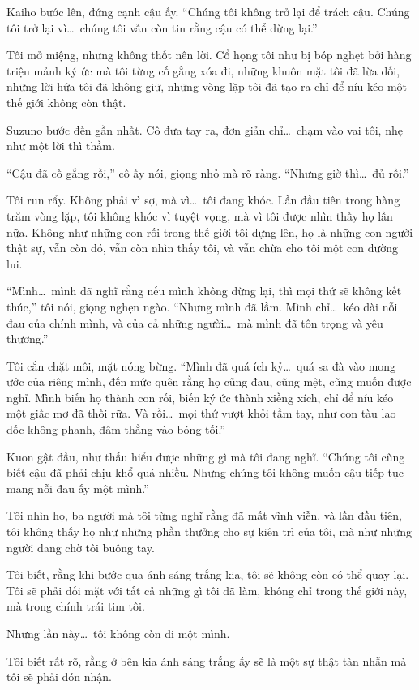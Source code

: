 \documentclass[../main.tex]{subfiles}
\begin{document}
Kaiho bước lên, đứng cạnh cậu ấy. ``Chúng tôi không trở lại để trách cậu. Chúng tôi trở lại vì\dots\ chúng tôi vẫn còn tin rằng cậu có thể dừng lại.''

Tôi mở miệng, nhưng không thốt nên lời. Cổ họng tôi như bị bóp nghẹt bởi hàng triệu mảnh ký ức mà tôi từng cố gắng xóa đi, những khuôn mặt tôi đã lừa dối, những lời hứa tôi đã không giữ, những vòng lặp tôi đã tạo ra chỉ để níu kéo một thế giới không còn thật.

Suzuno bước đến gần nhất. Cô đưa tay ra, đơn giản chỉ\dots\ chạm vào vai tôi, nhẹ như một lời thì thầm.

``Cậu đã cố gắng rồi,'' cô ấy nói, giọng nhỏ mà rõ ràng. ``Nhưng giờ thì\dots\  đủ rồi.''

Tôi run rẩy. Không phải vì sợ, mà vì\dots\ tôi đang khóc. Lần đầu tiên trong hàng trăm vòng lặp, tôi không khóc vì tuyệt vọng, mà vì tôi được nhìn thấy họ lần nữa. Không như những con rối trong thế giới tôi dựng lên, họ là những con người thật sự, vẫn còn đó, vẫn còn nhìn thấy tôi, và vẫn chừa cho tôi một con đường lui.

``Mình\dots\ mình đã nghĩ rằng nếu mình không dừng lại, thì mọi thứ sẽ không kết thúc,'' tôi nói, giọng nghẹn ngào. ``Nhưng mình đã lầm. Mình chỉ\dots\ kéo dài nỗi đau của chính mình, và của cả những người\dots\ mà mình đã tôn trọng và yêu thương.''

Tôi cắn chặt môi, mặt nóng bừng. ``Mình đã quá ích kỷ\dots\ quá sa đà vào mong ước của riêng mình, đến mức quên rằng họ cũng đau, cũng mệt, cũng muốn được nghỉ. Mình biến họ thành con rối, biến ký ức thành xiềng xích, chỉ để níu kéo một giấc mơ đã thối rữa. Và rồi\dots\ mọi thứ vượt khỏi tầm tay, như con tàu lao dốc không phanh, đâm thẳng vào bóng tối.''

Kuon gật đầu, như thấu hiểu được những gì mà tôi đang nghĩ. ``Chúng tôi cũng biết cậu đã phải chịu khổ quá nhiều. Nhưng chúng tôi không muốn cậu tiếp tục mang nỗi đau ấy một mình.''

Tôi nhìn họ,  ba người mà tôi từng nghĩ rằng đã mất vĩnh viễn. và lần đầu tiên, tôi không thấy họ như những phần thưởng cho sự kiên trì của tôi, mà như những người đang chờ tôi buông tay.

Tôi biết, rằng khi bước qua ánh sáng trắng kia, tôi sẽ không còn có thể quay lại. Tôi sẽ phải đối mặt với tất cả những gì tôi đã làm, không chỉ trong thế giới này, mà trong chính trái tim tôi.

Nhưng lần này\dots\ tôi không còn đi một mình.

Tôi biết rất rõ, rằng ở bên kia ánh sáng trắng ấy sẽ là một sự thật tàn nhẫn mà tôi sẽ phải đón nhận.
\end{document}
